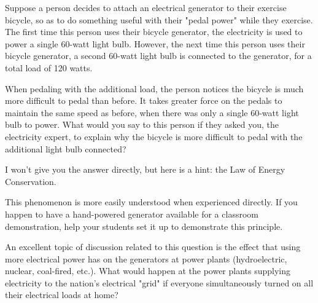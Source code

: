

Suppose a person decides to attach an electrical generator to their exercise bicycle, so as to do something useful with their "pedal power" while they exercise.  The first time this person uses their bicycle generator, the electricity is used to power a single 60-watt light bulb.  However, the next time this person uses their bicycle generator, a second 60-watt light bulb is connected to the generator, for a total load of 120 watts.

When pedaling with the additional load, the person notices the bicycle is much more difficult to pedal than before.  It takes greater force on the pedals to maintain the same speed as before, when there was only a single 60-watt light bulb to power.  What would you say to this person if they asked you, the electricity expert, to explain why the bicycle is more difficult to pedal with the additional light bulb connected?







I won't give you the answer directly, but here is a hint: the Law of Energy Conservation.







This phenomenon is more easily understood when experienced directly.  If you happen to have a hand-powered generator available for a classroom demonstration, help your students set it up to demonstrate this principle.

An excellent topic of discussion related to this question is the effect that using more electrical power has on the generators at power plants (hydroelectric, nuclear, coal-fired, etc.).  What would happen at the power plants supplying electricity to the nation's electrical "grid" if everyone simultaneously turned on all their electrical loads at home?




